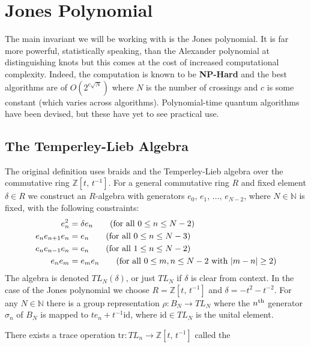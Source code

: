 \section{Jones Polynomial}
    The main invariant we will be working with is the Jones polynomial. It is
    far more powerful, statistically speaking, than the Alexander polynomial
    at distinguishing knots but this comes at the cost of increased
    computational complexity. Indeed, the computation is known to be
    \textbf{NP-Hard} and the best algorithms are of $O(2^{c\sqrt{N}})$ where
    $N$ is the number of crossings and $c$ is some constant (which varies
    across algorithms). Polynomial-time quantum algorithms have been devised,
    but these have yet to see practical use.
    \subsection{The Temperley-Lieb Algebra}
        The original definition uses braids and the Temperley-Lieb algebra
        over the commutative ring $\mathbb{Z}[t,\,t^{-1}]$. For a general
        commutative ring $R$ and fixed element $\delta\in{R}$ we construct
        an $R$-algebra with generators $e_{0},\,e_{1},\,\dots,\,e_{N-2}$,
        where $N\in\mathbb{N}$ is fixed, with the following constraints:
        \begin{align}
            e_{n}^{2}&=\delta{e}_{n}
            \tag{for all $0\leq{n}\leq{N-2}$}\\
            e_{n}e_{n+1}e_{n}&=e_{n}
            \tag{for all $0\leq{n}\leq{N-3}$}\\
            e_{n}e_{n-1}e_{n}&=e_{n}
            \tag{for all $1\leq{n}\leq{N-2}$}\\
            e_{n}e_{m}&=e_{m}e_{n}
            \tag{for all $0\leq{m,n}\leq{N-2}$ with $|m-n|\geq{2}$}
        \end{align}
        The algebra is denoted $TL_{N}(\delta)$, or just $TL_{N}$ if $\delta$
        is clear from context. In the case of the Jones polynomial we choose
        $R=\mathbb{Z}[t,\,t^{-1}]$ and $\delta=-t^{2}-t^{-2}$. For any
        $N\in\mathbb{N}$ there is a group representation
        $\rho:B_{N}\rightarrow{TL}_{N}$ where the $n^{\small\textrm{th}}$
        generator $\sigma_{n}$ of $B_{N}$ is mapped to
        $te_{n}+t^{-1}\textrm{id}$, where $\textrm{id}\in{TL}_{N}$ is the
        unital element.
        \par\hfill\par
        There exists a trace operation
        $\textrm{tr}:TL_{n}\rightarrow\mathbb{Z}[t,\,t^{-1}]$ called the
